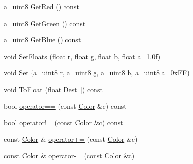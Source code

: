 \begin{DoxyCompactItemize}
\hyperlink{_common_defines_8h_afbe6c09973474a1f78f870f39073398f}{a\+\_\+uint8} \hyperlink{class_agmd_utilities_1_1_color_a6ad7d75d50aab670dbf6388f00f5a26b}{Get\+Red} () const 
\item 
\hyperlink{_common_defines_8h_afbe6c09973474a1f78f870f39073398f}{a\+\_\+uint8} \hyperlink{class_agmd_utilities_1_1_color_afaf41195889f84ff2ed965a1314748cc}{Get\+Green} () const 
\item 
\hyperlink{_common_defines_8h_afbe6c09973474a1f78f870f39073398f}{a\+\_\+uint8} \hyperlink{class_agmd_utilities_1_1_color_a2c86522c1722a0061e9145c1203c9db5}{Get\+Blue} () const 
\item 
void \hyperlink{class_agmd_utilities_1_1_color_a0d6555b4d2cb1430d220c5d71e26ef5b}{Set\+Floats} (float r, float \hyperlink{_examples_2_planet_2_app_8cpp_a8cf17d727651616de6f2b79ef32170cd}{g}, float b, float a=1.\+0f)
\item 
void \hyperlink{class_agmd_utilities_1_1_color_ac83264d4c8e976d243366041dc930873}{Set} (\hyperlink{_common_defines_8h_afbe6c09973474a1f78f870f39073398f}{a\+\_\+uint8} r, \hyperlink{_common_defines_8h_afbe6c09973474a1f78f870f39073398f}{a\+\_\+uint8} \hyperlink{_examples_2_planet_2_app_8cpp_a8cf17d727651616de6f2b79ef32170cd}{g}, \hyperlink{_common_defines_8h_afbe6c09973474a1f78f870f39073398f}{a\+\_\+uint8} b, \hyperlink{_common_defines_8h_afbe6c09973474a1f78f870f39073398f}{a\+\_\+uint8} a=0x\+F\+F)
\item 
void \hyperlink{class_agmd_utilities_1_1_color_a1883c09568d27ee49a120c4e0dd44666}{To\+Float} (float Dest\mbox{[}$\,$\mbox{]}) const 
\item 
bool \hyperlink{class_agmd_utilities_1_1_color_ac771841573965550c3cc72fa2b40888f}{operator==} (const \hyperlink{class_agmd_utilities_1_1_color}{Color} \&c) const 
\item 
bool \hyperlink{class_agmd_utilities_1_1_color_aa1fc6ba781b261093a811dcb5c854774}{operator!=} (const \hyperlink{class_agmd_utilities_1_1_color}{Color} \&c) const 
\item 
const \hyperlink{class_agmd_utilities_1_1_color}{Color} \& \hyperlink{class_agmd_utilities_1_1_color_a4b59dcc4c0063f43162564351fb10e41}{operator+=} (const \hyperlink{class_agmd_utilities_1_1_color}{Color} \&c)
\item 
const \hyperlink{class_agmd_utilities_1_1_color}{Color} \& \hyperlink{class_agmd_utilities_1_1_color_a4425e3bc6526d30a56edfcb3d3f679cf}{operator-\/=} (const \hyperlink{class_agmd_utilities_1_1_color}{Color} \&c)
\item 

\end{DoxyCompactItemize}
